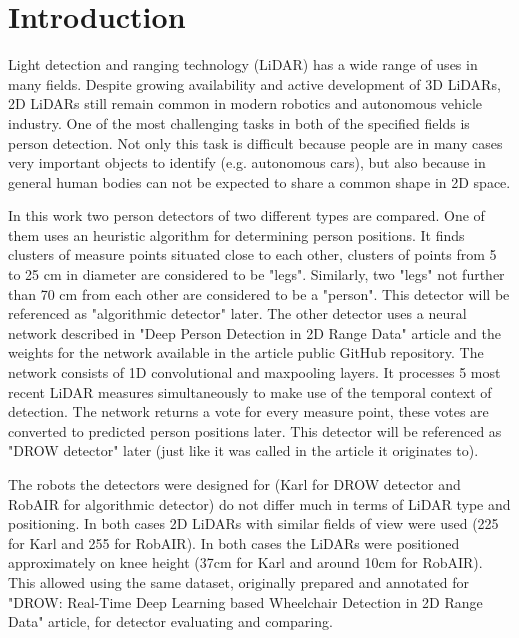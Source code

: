 \documentclass{article}
\begin{document}
\section{Introduction}

Light detection and ranging technology (LiDAR) has a wide range of uses in many fields\cite{lidar_market}.
Despite growing availability and active development of 3D LiDARs, 2D LiDARs still remain common in modern robotics\cite{lidar_popularity} and autonomous vehicle industry\cite{lidar_autonomous}.
One of the most challenging tasks in both of the specified fields is person detection.
Not only this task is difficult because people are in many cases very important objects to identify (e.g. autonomous cars), but also because in general human bodies can not be expected to share a common shape in 2D space.

In this work two person detectors of two different types are compared.
One of them uses an heuristic algorithm for determining person positions.
It finds clusters of measure points situated close to each other, clusters of points from 5 to 25 cm in diameter are considered to be "legs".
Similarly, two "legs" not further than 70 cm from each other are considered to be a "person".
This detector will be referenced as "algorithmic detector" later.
The other detector uses a neural network described in "Deep Person Detection in 2D Range Data"\cite{DROW_2018} article and the weights for the network available in the article public GitHub repository\cite{DROW_repo}.
The network consists of 1D convolutional and maxpooling layers.
It processes 5 most recent LiDAR measures simultaneously to make use of the temporal context of detection.
The network returns a vote for every measure point, these votes are converted to predicted person positions later.
This detector will be referenced as "DROW detector" later (just like it was called in the article it originates to).

The robots the detectors were designed for (Karl for DROW detector and RobAIR\cite{RobAIR_site} for algorithmic detector) do not differ much in terms of LiDAR type and positioning.
In both cases 2D LiDARs with similar fields of view were used (225\textdegree{} for Karl and 255\textdegree{} for RobAIR).
In both cases the LiDARs were positioned approximately on knee height (37cm for Karl and around 10cm for RobAIR).
This allowed using the same dataset, originally prepared and annotated for "DROW: Real-Time Deep Learning based Wheelchair Detection in 2D
Range Data"\cite{DROW_2016} article, for detector evaluating and comparing.
\end{document}
